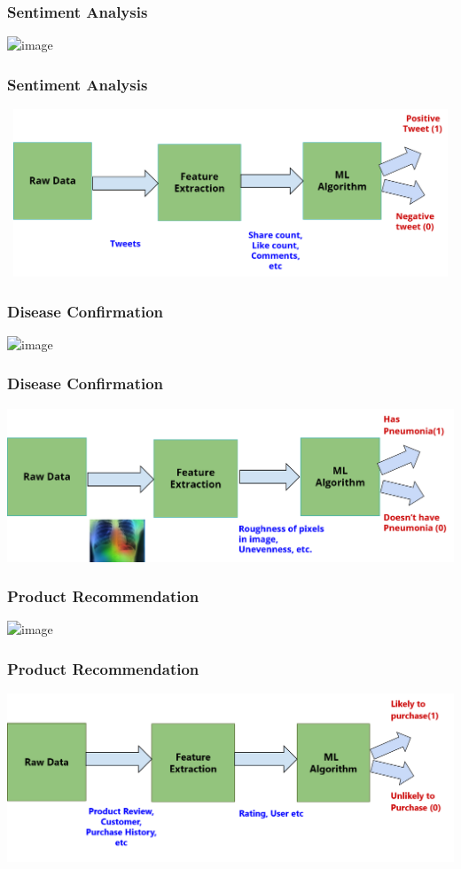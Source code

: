 \documentclass[aspectratio=169,14pt]{beamer}
\begin{document}
\begin{frame}
\frametitle{Sentiment Analysis}
\centering
	\includegraphics<2>[width=15cm]{Images/AAv_Picture11.png}

\end{frame}


\begin{frame}
\frametitle{Sentiment Analysis}
\centering
	\includegraphics[width=15cm,height=5cm]{Images/AAv_Picture12.png}

\end{frame}

\begin{frame}
\frametitle{Disease Confirmation}
\centering
	\includegraphics<2>[width=14cm]{Images/AAv_Picture13.png}

\end{frame}

\begin{frame}
\frametitle{Disease Confirmation}
\centering
	\includegraphics[width=15cm]{Images/AAv_Picture14.png}

\end{frame}


\begin{frame}
\frametitle{Product Recommendation}
\centering
	\includegraphics<2>[width=15cm]{Images/AAv_Picture17.png}

\end{frame}

\begin{frame}
\frametitle{Product Recommendation}
\centering
	\includegraphics[width=15cm]{Images/AAv_Picture18.png}

\end{frame}
\end{document}
